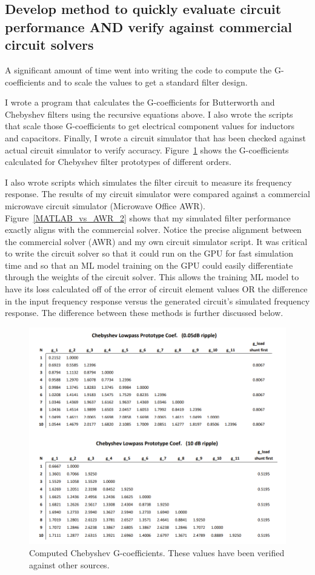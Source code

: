 \documentclass[10pt,conference]{IEEEtran}
\begin{document}
\subsection{Develop method to quickly evaluate circuit performance AND verify against commercial circuit solvers}


A significant amount of time went into writing the code to compute the G-coefficients and to scale the values to get a standard filter design. 

I wrote a program that calculates the G-coefficients for Butterworth and Chebyshev filters using the recursive equations above. I also wrote the scripts that scale those G-coefficients to get electrical component values for inductors and capacitors. Finally, I wrote a circuit simulator that has been checked against actual circuit simulator to verify accuracy. Figure~\ref{Chebyshev_G_coefs} shows the G-coefficients calculated for Chebyshev filter prototypes of different orders.


I also wrote scripts which simulates the filter circuit to measure its frequency response. The results of my circuit simulator were compared against a commercial microwave circuit simulator (Microwave Office AWR). Figure~\ref{MATLAB_vs_AWR_2} shows that my simulated filter performance exactly aligns with the commercial solver. Notice the precise alignment between the commercial solver (AWR) and my own circuit simulator script. It was critical to write the circuit solver so that it could run on the GPU for fast simulation time and so that an ML model training on the GPU could easily differentiate through the weights of the circuit solver. This allows the training ML model to have its loss calculated off of the error of circuit element values OR the difference in the input frequency response versus the generated circuit's simulated frequency response. The difference between these methods is further discussed below.




\begin{figure}
	\centering
	\includegraphics[width=0.9\linewidth]{Figures/Chebyshev_G_coefs.png}
	\caption{Computed Chebyshev G-coefficients. These values have been verified against other sources.}
	\label{Chebyshev_G_coefs}
\end{figure}
\end{document}
